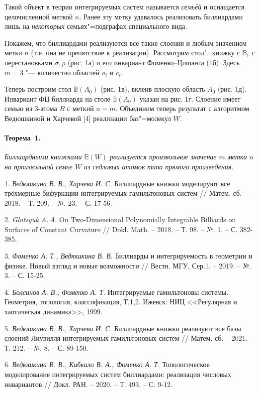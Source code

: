 Такой объект в теории интегрируемых систем называется \textit{семьёй} и оснащается целочисленной меткой $n$. Ранее эту метку удавалось реализовать биллиардами лишь на \textit{некоторых} семьях"=подграфах специального вида. %

Покажем, что биллиардами реализуются все такие слоения и любым значением метки $n$ (т.е. она не препятствие к реализации). Рассмотрим стол"=книжку с  $\mathbb{B}_1$ с перестановками $\sigma, \rho$ (рис. 1а) и его инвариант Фоменко--Цишанга (1б). Здесь $m = 3$ "--- количество областей $a_i$ и $c_i$.

Теперь построим стол $\mathbb{B}(A_0)$ (рис. 1в), вклеив плоскую область $A_0$ (рис. 1д). Инвариант ФЦ биллиарда на столе $\mathbb{B}(A_0)$ указан на рис. 1г. Слоение имеет семью из 3-атома $B$ с меткий $n = m$. Объединим теперь результат с алгоритмом Ведюшкиной и Харчевой [4]  реализации баз"=молекул $W$.

\paragraph{Теорема~1.}
{\it
	Биллиардными книжками $\mathbb{B}(W)$ реализуется произвольное значение $m$ метки $n$ на произвольной семье $W$ из седловых атомов типа прямого произведения.
}


\begin{figure}[h]
			\label{elementarybilliards}
		\end{figure}


\litlist

1. {\it Ведюшкина В. В., Харчева И. С.}
Биллиардные книжки моделируют все трёхмерные бифуркации интегрируемых гамильтоновых систем // Матем. сб. – 2018. – Т. 209. – №. 23. – С. 17-56.

2. {\it Glutsyuk A.\,A.} On Two-Dimensional Polynomially Integrable Billiards
on Surfaces of Constant Curvature // Dokl. Math. – 2018. – Т. 98. – №. 1. – С. 382-385.

3. {\it Фоменко А. Т., Ведюшкина В. В.} Биллиарды и интегрируемость в геометрии и физике. Новый взгляд и новые возможности // Вестн. МГУ, Сер.1. – 2019. – №. 3. – С. 15-25.

4. {\it Болсинов А. В., Фоменко А. Т.}
Интегрируемые гамильтоновы системы. Геометрия, топология, классификация, Т.1,2.
Ижевск: НИЦ <<Регулярная и хаотическая динамика>>, 1999.

5. {\it Ведюшкина В. В., Харчева И. С.}
Биллиардные книжки реализуют все базы слоений Лиувилля интегрируемых гамильтоновых систем // Матем. сб. – 2021. – Т. 212. – №. 8. – С. 89-150.

6. {\it Ведюшкина В. В.,  Кибкало В. А., Фоменко А. Т.} Топологическое моделирование интегрируемых систем биллиардами: реализация числовых инвариантов // Докл. РАН. – 2020. – Т. 493. – С. 9-12.
